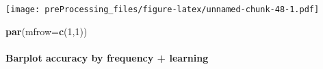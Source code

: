 \documentclass[
]{article}
\newenvironment{Shaded}{\begin{snugshade}}{\end{snugshade}}
\newcommand{\DataTypeTok}[1]{\textcolor[rgb]{0.13,0.29,0.53}{#1}}
\newcommand{\DecValTok}[1]{\textcolor[rgb]{0.00,0.00,0.81}{#1}}
\newcommand{\KeywordTok}[1]{\textcolor[rgb]{0.13,0.29,0.53}{\textbf{#1}}}
\newcommand{\NormalTok}[1]{#1}
\begin{document}
\texttt{[image: preProcessing\_files/figure-latex/unnamed-chunk-48-1.pdf]}

\begin{Shaded}
\begin{Highlighting}[]
\KeywordTok{par}\NormalTok{(}\DataTypeTok{mfrow=}\KeywordTok{c}\NormalTok{(}\DecValTok{1}\NormalTok{,}\DecValTok{1}\NormalTok{))}
\end{Highlighting}
\end{Shaded}

\hypertarget{barplot-accuracy-by-frequency-learning}{%
\paragraph{Barplot accuracy by frequency +
learning}\label{barplot-accuracy-by-frequency-learning}}
\end{document}
